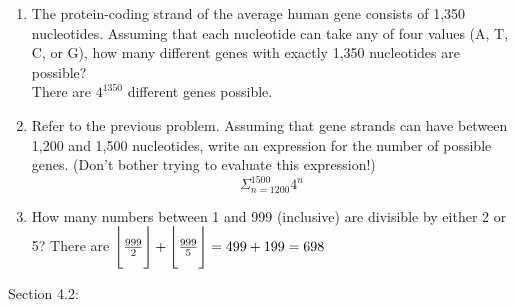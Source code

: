 \documentclass[10pt]{article}
\DeclarePairedDelimiter\floor{\lfloor}{\rfloor}
\begin{document}
\begin{enumerate}
  \item The protein-coding strand of the average human gene consists of 1,350 nucleotides. Assuming that each nucleotide can take any of four values (A, T, C, or G), how many different genes with exactly 1,350 nucleotides are possible?\\
  There are $4^{1350}$ different genes possible.

  \item Refer to the previous problem. Assuming that gene strands can have between 1,200 and 1,500 nucleotides, write an expression for the number of possible genes. (Don’t bother trying to evaluate this expression!)
  \[\Sigma_{n=1200}^{1500} 4^n\]

  \item How many numbers between 1 and 999 (inclusive) are divisible by either 2 or 5?
  There are $\floor[\Bigg]{\frac{999}{2}} + \floor[\Bigg]{\frac{999}{5}} = 499 + 199 = 698$

\end{enumerate}

Section 4.2:
\end{document}
